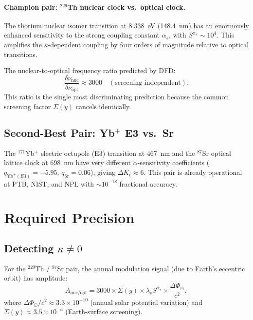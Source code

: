 \documentclass[11pt]{article}
\newcommand{\ee}[1]{\times 10^{#1}}
\begin{document}
\paragraph{Champion pair: $^{229}$Th nuclear clock vs.\ optical clock.}
The thorium nuclear isomer transition at 8.338~eV (148.4~nm) has
an enormously enhanced sensitivity to the strong coupling constant
$\alpha_s$, with $S^{\alpha_s} \sim 10^4$.  This amplifies the
$\kappa$-dependent coupling by four orders of magnitude relative to
optical transitions.

The nuclear-to-optical frequency ratio predicted by DFD:
\begin{equation}
\frac{\delta\nu_{\text{nuc}}}{\delta\nu_{\text{opt}}} \approx 3000
\quad (\text{screening-independent}).
\end{equation}
This ratio is the single most discriminating prediction because the
common screening factor $\Sigma(y)$ cancels identically.

\subsection{Second-Best Pair: Yb$^+$ E3 vs.\ Sr}

The $^{171}$Yb$^+$ electric octupole (E3) transition at 467~nm and
the $^{87}$Sr optical lattice clock at 698~nm have very different
$\alpha$-sensitivity coefficients ($q_{\text{Yb}^+(E3)} = -5.95$,
$q_{\text{Sr}} = 0.06$), giving $\Delta K_\epsilon \approx 6$.
This pair is already operational at PTB, NIST, and NPL with
$\sim 10^{-18}$ fractional accuracy.

\section{Required Precision}
\label{sec:clock-precision}

\subsection{Detecting $\kappa \neq 0$}

For the $^{229}$Th / $^{87}$Sr pair, the annual modulation signal
(due to Earth's eccentric orbit) has amplitude:
\begin{equation}
A_{\text{nuc/opt}} = 3000 \times \Sigma(y) \times \lambda_s S^{\alpha_s}
\times \frac{\Delta\Phi_\odot}{c^2},
\end{equation}
where $\Delta\Phi_\odot/c^2 \approx 3.3\ee{-10}$ (annual solar
potential variation) and $\Sigma(y) \approx 3.5\ee{-6}$ (Earth-surface
screening).
\end{document}

